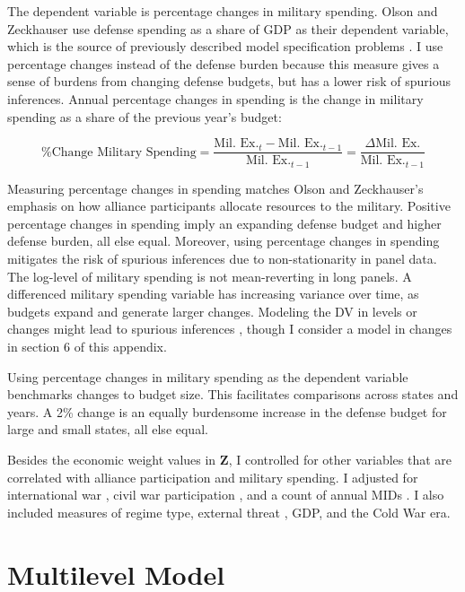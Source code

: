 \documentclass[12pt]{article}
\begin{document}
The dependent variable is percentage changes in military spending. 
Olson and Zeckhauser use defense spending as a share of GDP as their dependent variable, which is the source of previously described model specification problems \citep{PluemperNeumayer2015}. 
I use percentage changes instead of the defense burden because this measure gives a sense of burdens from changing defense budgets, but has a lower risk of spurious inferences. 
Annual percentage changes in spending is the change in military spending as a share of the previous year's budget:


\begin{equation}
\mbox{\% Change Military Spending} = \frac{\mbox{Mil. Ex.}_t - \mbox{Mil. Ex.}_{t-1} }{ \mbox{Mil. Ex.}_{t-1} } = \frac{\Delta \mbox{Mil. Ex.} }{ \mbox{Mil. Ex.}_{t-1} }
\end{equation} 


Measuring percentage changes in spending matches Olson and Zeckhauser's emphasis on how alliance participants allocate resources to the military.
Positive percentage changes in spending imply an expanding defense budget and higher defense burden, all else equal.
Moreover, using percentage changes in spending mitigates the risk of spurious inferences due to non-stationarity in panel data. 
The log-level of military spending is not mean-reverting in long panels.
A differenced military spending variable has increasing variance over time, as budgets expand and generate larger changes. 
Modeling the DV in levels or changes might lead to spurious inferences \citep{GrangerNewbold1974}, though I consider a model in changes in section 6 of this appendix. 


Using percentage changes in military spending as the dependent variable benchmarks changes to budget size. 
This facilitates comparisons across states and years. 
A 2\% change is an equally burdensome increase in the defense budget for large and small states, all else equal. 


Besides the economic weight values in \textbf{Z}, I controlled for other variables that are correlated with alliance participation and military spending. 
I adjusted for international war \citep{Reiteretal2016}, civil war participation \citep{SarkeesWayman2010}, and a count of annual MIDs \citep{Gibleretal2016}. 
I also included measures of regime type, external threat \citep{LeedsSavun2007}, GDP, and the Cold War era. 

 


\section{Multilevel Model}
\end{document}
